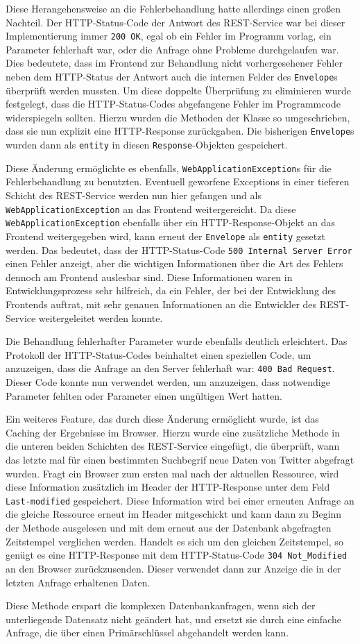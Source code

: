 Diese Herangehensweise an die Fehlerbehandlung hatte allerdings einen großen Nachteil. Der HTTP-Status-Code der Antwort des REST-Service war bei dieser Implementierung immer \texttt{200 OK}, egal ob ein Fehler im Programm vorlag, ein Parameter fehlerhaft war, oder die Anfrage ohne Probleme durchgelaufen war. Dies bedeutete, dass im Frontend zur Behandlung nicht vorhergesehener Fehler neben dem HTTP-Status der Antwort auch die internen Felder des \texttt{Envelope}s überprüft werden mussten. Um diese doppelte Überprüfung zu eliminieren wurde festgelegt, dass die HTTP-Status-Codes abgefangene Fehler im Programmcode widerspiegeln sollten. Hierzu wurden die Methoden der Klasse so umgeschrieben, dass sie nun explizit eine HTTP-Response zurückgaben. Die bisherigen \texttt{Envelope}s wurden dann als \texttt{entity} in diesen \texttt{Response}-Objekten gespeichert.

Diese Änderung ermöglichte es ebenfalls, \texttt{WebApplicationException}s für die Fehlerbehandlung zu benutzten. Eventuell geworfene Exceptions in einer tieferen Schicht des REST-Service werden nun hier gefangen und als \texttt{WebApplicationException} an das Frontend weitergereicht. Da diese \texttt{WebApplicationException} ebenfalls über ein HTTP-Response-Objekt an das Frontend weitergegeben wird, kann erneut der \texttt{Envelope} als \texttt{entity} gesetzt werden. Das bedeutet, dass der HTTP-Status-Code \texttt{500 Internal Server Error} einen Fehler anzeigt, aber die wichtigen Informationen über die Art des Fehlers dennoch am Frontend auslesbar sind. Diese Informationen waren in Entwicklungsprozess sehr hilfreich, da ein Fehler, der bei der Entwicklung des Frontends auftrat, mit sehr genauen Informationen an die Entwickler des REST-Service weitergeleitet werden konnte. 

Die Behandlung fehlerhafter Parameter wurde ebenfalls deutlich erleichtert. Das Protokoll der HTTP-Status-Codes beinhaltet einen speziellen Code, um anzuzeigen, dass die Anfrage an den Server fehlerhaft war: \texttt{400 Bad Request}. Dieser Code konnte nun verwendet werden, um anzuzeigen, dass notwendige Parameter fehlten oder Parameter einen ungültigen Wert hatten.

Ein weiteres Feature, das durch diese Änderung ermöglicht wurde, ist das Caching der Ergebnisse im Browser. Hierzu wurde eine zusätzliche Methode in die unteren beiden Schichten des REST-Service eingefügt, die überprüft, wann das letzte mal für einen bestimmten Suchbegrif neue Daten von Twitter abgefragt wurden. Fragt ein Browser zum ersten mal nach der aktuellen Ressource, wird diese Information zusätzlich im Header der HTTP-Response unter dem Feld \texttt{Last-modified} gespeichert. Diese Information wird bei einer erneuten Anfrage an die gleiche Ressource erneut im Header mitgeschickt und kann dann zu Beginn der Methode ausgelesen und mit dem erneut aus der Datenbank abgefragten Zeitstempel verglichen werden. Handelt es sich um den gleichen Zeitstempel, so genügt es eine HTTP-Response mit dem HTTP-Status-Code \texttt{304 Not\_Modified} an den Browser zurückzusenden. Dieser verwendet dann zur Anzeige die in der letzten Anfrage erhaltenen Daten. 

Diese Methode erspart die komplexen Datenbankanfragen, wenn sich der unterliegende Datensatz nicht geändert hat, und ersetzt sie durch eine einfache Anfrage, die über einen Primärschlüssel abgehandelt werden kann.